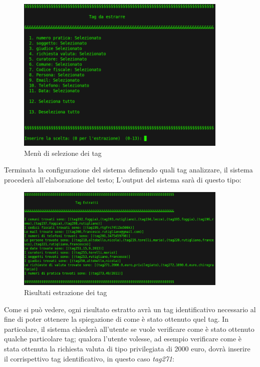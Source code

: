 \begin{figure}[H]
	\centering
	\includegraphics[width=0.9\textwidth]{img/interfaces/CLI-tagSelect.png}
	\caption[Schermata CLI tag select]{Menù di selezione dei tag}
	\label{CLI-tagSelect}
\end{figure}

Terminata la configurazione del sistema definendo quali tag analizzare, il sistema procederà all'elaborazione del testo; L'output del sistema sarà di questo tipo:
\begin{figure}[H]
	\centering
	\includegraphics[width=0.9\textwidth]{img/interfaces/CLI-result.png}
	\caption[Schermata CLI result]{Risultati estrazione dei tag}
	\label{CLI-result}
\end{figure}

Come si può vedere, ogni risultato estratto avrà un tag identificativo necessario al fine di poter ottenere la spiegazione di come è stato ottenuto quel tag. In particolare, il sistema chiederà all'utente se vuole verificare come è stato ottenuto qualche particolare tag; qualora l'utente volesse, ad esempio verificare come è stata ottenuta la richiesta valuta di tipo privilegiata di 2000 euro, dovrà inserire il corrispettivo tag identificativo, in questo caso \emph{tag271}:

